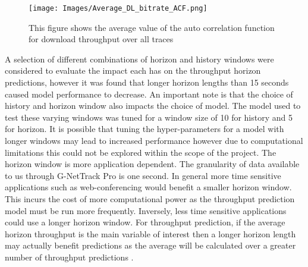 \begin{figure}[h]
\texttt{[image: Images/Average\_DL\_bitrate\_ACF.png]}
\centering
\caption{This figure shows the average value of the auto correlation function for download throughput over all traces}
\label{fig:dl_acf}
\end{figure}

A selection of different combinations of horizon and history windows were considered to evaluate the impact each has on the throughput horizon predictions, however it was found that longer horizon lengths than 15 seconds caused model performance to decrease. An important note is that the choice of history and horizon window also impacts the choice of model. The model used to test these varying windows was tuned for a window size of 10 for history and 5 for horizon. It is possible that tuning the hyper-parameters for a model with longer windows may lead to increased performance however due to computational limitations this could not be explored within the scope of the project. The horizon window is more application dependent. The granularity of data available to us through G-NetTrack Pro is one second. In general more time sensitive applications such as web-conferencing would benefit a smaller horizon window. This incurs the cost of more computational power as the throughput prediction model must be run more frequently. Inversely, less time sensitive applications could use a longer horizon window. For throughput prediction, if the average horizon throughput is the main variable of interest then a longer horizon length may actually benefit predictions as the average will be calculated over a greater number of throughput predictions \cite{raca2019improving}.

